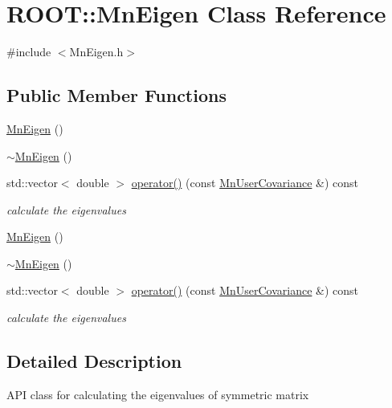 \hypertarget{classROOT_1_1Minuit2_1_1MnEigen}{}\section{R\+O\+OT\+:\+:Mn\+Eigen Class Reference}
\label{classROOT_1_1Minuit2_1_1MnEigen}


{\ttfamily \#include $<$Mn\+Eigen.\+h$>$}

\subsection*{Public Member Functions}
\begin{DoxyCompactItemize}
\item 
\mbox{\hyperlink{classROOT_1_1Minuit2_1_1MnEigen_a712f43d98a8d51bd585889185d424fba}{Mn\+Eigen}} ()
\item 
\mbox{\hyperlink{classROOT_1_1Minuit2_1_1MnEigen_a1c3b3cbc2976616c779f394121798093}{$\sim$\+Mn\+Eigen}} ()
\item 
std\+::vector$<$ double $>$ \mbox{\hyperlink{classROOT_1_1Minuit2_1_1MnEigen_aba6999f348c2cbc8055528faf207b7d6}{operator()}} (const \mbox{\hyperlink{classROOT_1_1Minuit2_1_1MnUserCovariance}{Mn\+User\+Covariance}} \&) const
\begin{DoxyCompactList}\small\item\em calculate the eigenvalues \end{DoxyCompactList}\item 
\mbox{\hyperlink{classROOT_1_1Minuit2_1_1MnEigen_a712f43d98a8d51bd585889185d424fba}{Mn\+Eigen}} ()
\item 
\mbox{\hyperlink{classROOT_1_1Minuit2_1_1MnEigen_a1c3b3cbc2976616c779f394121798093}{$\sim$\+Mn\+Eigen}} ()
\item 
std\+::vector$<$ double $>$ \mbox{\hyperlink{classROOT_1_1Minuit2_1_1MnEigen_aba021c8f81549aae00ad600c3d3c2f93}{operator()}} (const \mbox{\hyperlink{classROOT_1_1Minuit2_1_1MnUserCovariance}{Mn\+User\+Covariance}} \&) const
\begin{DoxyCompactList}\small\item\em calculate the eigenvalues \end{DoxyCompactList}\end{DoxyCompactItemize}


\subsection{Detailed Description}
A\+PI class for calculating the eigenvalues of symmetric matrix 

